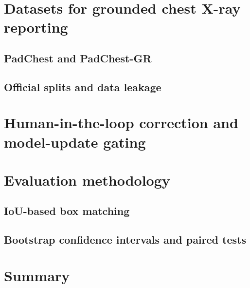 \section{Datasets for grounded chest X-ray reporting}
\subsection{PadChest and PadChest-GR}
\subsection{Official splits and data leakage}

\section{Human-in-the-loop correction and model-update gating}

\section{Evaluation methodology}
\subsection{IoU-based box matching}
\subsection{Bootstrap confidence intervals and paired tests}

\section{Summary}

